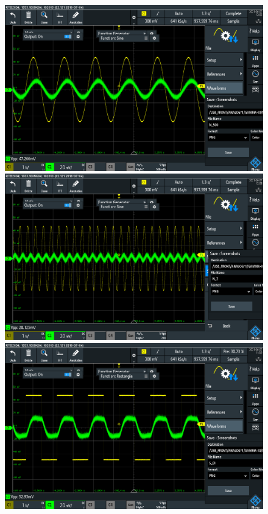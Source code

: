 \documentclass[journal]{Imperial_lab_report}
\begin{document}
\begin{appendices}
\begin{figure}[ht]
            \centering
            \includegraphics[scale = 0.10]{G10_N_500_pic.PNG}
            \includegraphics[scale = 0.10]{G10_N_2000_pic.PNG}
            \includegraphics[scale = 0.10]{G10_S_500_pic.PNG}

\end{figure}
\end{appendices}
\end{document}
